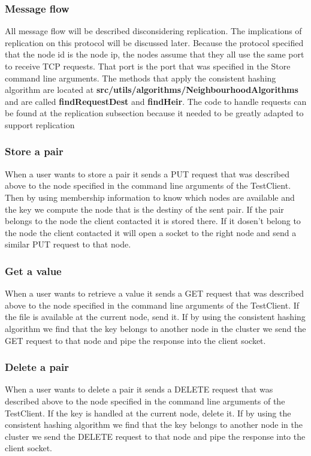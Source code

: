 \subsubsection{Message flow}
All message flow will be described disconsidering replication. The implications of replication on this protocol will be discussed later. Because the protocol specified that the node id is the node ip, the nodes assume that they all use the same port to receive TCP requests. That port is the port that was specified in the Store command line arguments. The methods that apply the consistent hashing algorithm are located at \textbf{src/utils/algorithms/NeighbourhoodAlgorithms} and are called \textbf{findRequestDest} and \textbf{findHeir}. The code to handle requests can be found at the replication subsection because it needed to be greatly adapted to support replication
\subsubsection{Store a pair}
When a user wants to store a pair it sends a PUT request that was described above to the node specified in the command line arguments of the TestClient. Then by using membership information to know which nodes are available and the key we compute the node that is the destiny of the sent pair. If the pair belongs to the node the client contacted it is stored there. If it dosen't belong to the node the client contacted it will open a socket to the right node and send a similar PUT request to that node.

\subsubsection{Get a value}
When a user wants to retrieve a value it sends a GET request that was described above to the node specified in the command line arguments of the TestClient. If the file is available at the current node, send it. If by using the consistent hashing algorithm we find that the key belongs to another node in the cluster we send the GET request to that node and pipe the response into the client socket.

\subsubsection{Delete a pair}
When a user wants to delete a pair it sends a DELETE request that was described above to the node specified in the command line arguments of the TestClient. If the key is handled at the current node, delete it. If by using the consistent hashing algorithm we find that the key belongs to another node in the cluster we send the DELETE request to that node and pipe the response into the client socket.